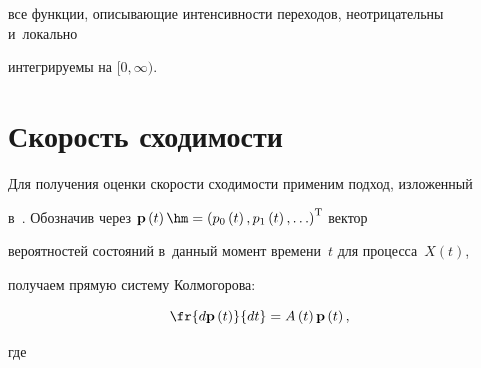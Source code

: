 все функции, описывающие  интенсивности переходов, не\-от\-ри\-ца\-тель\-ны и~локально 

интегрируемы на $[0,\infty)$.

        

            

        \section{Скорость сходимости}

        

        Для получения оценки скорости сходимости применим подход, изложенный 

в~\cite{Zeifman2020porto}. Обозначив через $\mathbf{p}\left(t\right)\hm = 

\left(p_{0}\left(t\right), p_{1}\left(t\right), \ldots\right)^{\mathrm{T}}$ вектор 

вероятностей состояний в~данный момент времени~$t$ для процесса~$X(t)$, 

получаем прямую систему Колмогорова:

        \begin{equation}

            \fr{d \mathbf{p} \left(t\right)}{dt}=A\left(t\right)\mathbf{p} 

\left(t \right),

            \label{s1}

        \end{equation}

        где

